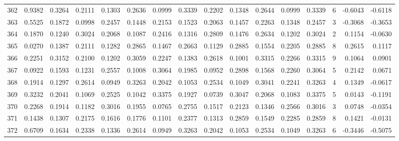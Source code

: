 \begin{tabular}{lrrrrrrrrrrrrrrr}
362 &      0.9382 &  0.3264 &  0.2111 &  0.1303 &  0.2636 &  0.0999 &  0.3339 &  0.2202 &  0.1348 &  0.2644 &   0.0999 &     0.3339 &      6 &                   -0.6043 &                    -0.6118 \\
363 &      0.5525 &  0.1872 &  0.0998 &  0.2457 &  0.1448 &  0.2153 &  0.1523 &  0.2063 &  0.1457 &  0.2263 &   0.1348 &     0.2457 &      3 &                   -0.3068 &                    -0.3653 \\
364 &      0.1870 &  0.1240 &  0.3024 &  0.2068 &  0.1087 &  0.2416 &  0.1316 &  0.2809 &  0.1476 &  0.2634 &   0.1202 &     0.3024 &      2 &                    0.1154 &                    -0.0630 \\
365 &      0.0270 &  0.1387 &  0.2111 &  0.1282 &  0.2865 &  0.1467 &  0.2663 &  0.1129 &  0.2885 &  0.1554 &   0.2205 &     0.2885 &      8 &                    0.2615 &                     0.1117 \\
366 &      0.2251 &  0.3152 &  0.2100 &  0.1202 &  0.3059 &  0.2247 &  0.1383 &  0.2618 &  0.1001 &  0.3315 &   0.2266 &     0.3315 &      9 &                    0.1064 &                     0.0901 \\
367 &      0.0922 &  0.1593 &  0.1231 &  0.2557 &  0.1008 &  0.3064 &  0.1985 &  0.0952 &  0.2898 &  0.1568 &   0.2260 &     0.3064 &      5 &                    0.2142 &                     0.0671 \\
368 &      0.1914 &  0.1297 &  0.2614 &  0.0949 &  0.3263 &  0.2042 &  0.1053 &  0.2534 &  0.1049 &  0.3041 &   0.2241 &     0.3263 &      4 &                    0.1349 &                    -0.0617 \\
369 &      0.3232 &  0.2041 &  0.1069 &  0.2525 &  0.1042 &  0.3375 &  0.1927 &  0.0739 &  0.3047 &  0.2068 &   0.1083 &     0.3375 &      5 &                    0.0143 &                    -0.1191 \\
370 &      0.2268 &  0.1914 &  0.1182 &  0.3016 &  0.1955 &  0.0765 &  0.2755 &  0.1517 &  0.2123 &  0.1346 &   0.2566 &     0.3016 &      3 &                    0.0748 &                    -0.0354 \\
371 &      0.1438 &  0.1307 &  0.2175 &  0.1616 &  0.1776 &  0.1101 &  0.2377 &  0.1313 &  0.2859 &  0.1549 &   0.2285 &     0.2859 &      8 &                    0.1421 &                    -0.0131 \\
372 &      0.6709 &  0.1634 &  0.2338 &  0.1336 &  0.2614 &  0.0949 &  0.3263 &  0.2042 &  0.1053 &  0.2534 &   0.1049 &     0.3263 &      6 &                   -0.3446 &                    -0.5075 \\

\end{tabular}
